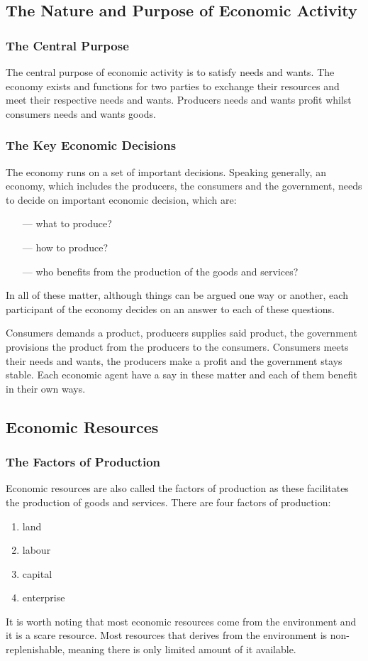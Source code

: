 \documentclass[a4paper,10pt]{article}
\begin{document}
\begin{multicols}{2}
	\subsection{The Nature and Purpose of Economic Activity}
	\subsubsection{The Central Purpose}
	The central purpose of economic activity is to satisfy needs and wants. The economy exists and functions for two parties to exchange their resources and meet their respective needs and wants. Producers needs and wants profit whilst consumers needs and wants goods.

	\subsubsection{The Key Economic Decisions}
	The economy runs on a set of important decisions. Speaking generally, an economy, which includes the producers, the consumers and the government, needs to decide on important economic decision, which are:
	\begin{enumerate}
		\item[---] what to produce?
		\item[---] how to produce?
		\item[---] who benefits from the production of the goods and services?
	\end{enumerate}
	In all of these matter, although things can be argued one way or another, each participant of the economy decides on an answer to each of these questions.
	\medskip

	Consumers demands a product, producers supplies said product, the government provisions the product from the producers to the consumers. Consumers meets their needs and wants, the producers make a profit and the government stays stable. Each economic agent have a say in these matter and each of them benefit in their own ways.

	\subsection{Economic Resources}
	\subsubsection{The Factors of Production}
	Economic resources are also called the factors of production as these facilitates the production of goods and services. There are four factors of production:
	\begin{enumerate}
		\item land
		\item labour
		\item capital
		\item enterprise
	\end{enumerate}
	It is worth noting that most economic resources come from the environment and it is a scare resource. Most resources that derives from the environment is non-replenishable, meaning there is only limited amount of it available.


\end{multicols}
\end{document}
